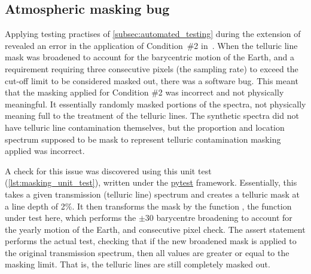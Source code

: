 \subsection{Atmospheric masking bug}
\label{subsec:condition_two_bug}
Applying testing practises of \cref{subsec:automated_testing} during the extension of \eniric{} revealed an error in the application of Condition~\#2 in~\citet{figueira_radial_2016}.
When the telluric line mask was broadened to account for the barycentric motion of the Earth, and a requirement requiring three consecutive pixels (the sampling rate) to exceed the cut-off limit to be considered masked out, there was a software bug.
This meant that the masking applied for Condition \#2 was incorrect and not physically meaningful.
It essentially randomly masked portions of the spectra, not physically meaning full to the treatment of the telluric lines.
The synthetic spectra did not have telluric line contamination themselves, but the proportion and location spectrum supposed to be mask to represent telluric contamination masking applied was incorrect.

A check for this issue was discovered using this unit test (\cref{lst:masking_unit_test}), written under the \href{https://docs.pytest.org}{pytest} framework.
Essentially, this takes a given transmission (telluric line) spectrum and creates a telluric mask at a line depth of 2\%.
It then transforms the mask by the function , the function under test here, which performs the \(\pm30\)\kmps{} barycentre broadening to account for the yearly motion of the Earth, and consecutive pixel check.
The assert statement performs the actual test, checking that if the new broadened mask is applied to the original transmission spectrum, then all values are greater or equal to the masking limit.
That is, the telluric lines are still completely masked out.

